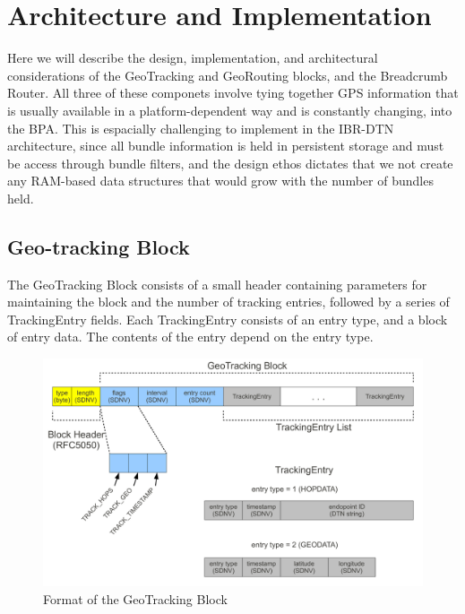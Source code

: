 \documentclass{sig-alternate}
\begin{document}
%
%
\section{Architecture and Implementation}

Here we will describe the design, implementation, and architectural considerations of the GeoTracking and GeoRouting blocks, and the Breadcrumb Router.  All three of these componets involve tying together GPS information that is usually available in a platform-dependent way and is constantly changing, into the BPA.  This is espacially challenging to implement in the IBR-DTN architecture, since all bundle information is held in persistent storage and must be access through bundle filters, and the design ethos dictates that we not create any RAM-based data structures that would grow with the number of bundles held.


\subsection{Geo-tracking Block}

The GeoTracking Block consists of a small header containing parameters for maintaining the block and the number of tracking entries, followed by a series of TrackingEntry fields.  Each TrackingEntry consists of an entry type, and a block of entry data.  The contents of the entry depend on the entry type.

\begin{figure}
\begin{center}
\includegraphics[width=.9\columnwidth]{figures/tracking-block.pdf}
\end{center}
\caption{Format of the GeoTracking Block}
\label{fig:tracking-block}
\end{figure}
\end{document}
